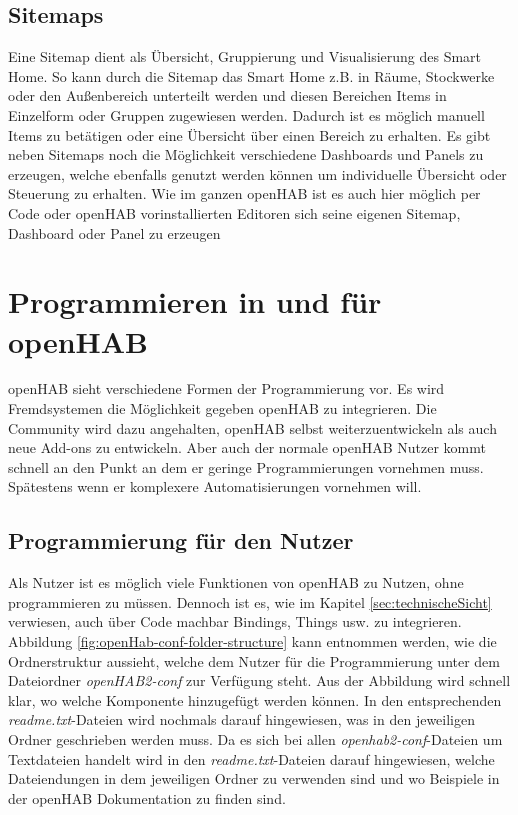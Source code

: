 \subsection{Sitemaps}
Eine Sitemap dient als Übersicht, Gruppierung und Visualisierung des Smart Home. So kann durch die Sitemap das Smart Home z.B. in Räume, Stockwerke oder den Außenbereich unterteilt werden und diesen Bereichen Items in Einzelform oder Gruppen zugewiesen werden. Dadurch ist es möglich manuell Items zu betätigen oder eine Übersicht über einen Bereich zu erhalten. Es gibt neben Sitemaps noch die Möglichkeit verschiedene Dashboards und Panels zu erzeugen, welche ebenfalls genutzt werden können um individuelle Übersicht oder Steuerung zu erhalten.
Wie im ganzen openHAB ist es auch hier möglich per Code oder openHAB vorinstallierten Editoren sich seine eigenen Sitemap, Dashboard oder Panel zu erzeugen

\section{Programmieren in und für openHAB} \label{sec:custom-development}
openHAB sieht verschiedene Formen der Programmierung vor. Es wird Fremdsystemen die Möglichkeit gegeben openHAB zu integrieren. Die Community wird dazu angehalten, openHAB selbst weiterzuentwickeln als auch neue Add-ons zu entwickeln. Aber auch der normale openHAB Nutzer kommt schnell an den Punkt an dem er geringe Programmierungen vornehmen muss. Spätestens wenn er komplexere Automatisierungen vornehmen will.

\subsection{Programmierung für den Nutzer}
Als Nutzer ist es möglich viele Funktionen von openHAB zu Nutzen, ohne programmieren zu müssen. Dennoch ist es, wie im Kapitel \ref{sec:technischeSicht} verwiesen, auch über Code machbar Bindings, Things usw. zu integrieren. Abbildung \ref{fig:openHab-conf-folder-structure} kann entnommen werden, wie die Ordnerstruktur aussieht, welche dem Nutzer für die Programmierung unter dem Dateiordner \textit{openHAB2-conf} zur Verfügung steht. Aus der Abbildung wird schnell klar, wo welche Komponente hinzugefügt werden können. In den entsprechenden \textit{readme.txt}-Dateien wird nochmals darauf hingewiesen, was in den jeweiligen Ordner geschrieben werden muss. Da es sich bei allen \textit{openhab2-conf}-Dateien um Textdateien handelt wird in den \textit{readme.txt}-Dateien darauf hingewiesen, welche Dateiendungen in dem jeweiligen Ordner zu verwenden sind und wo Beispiele in der openHAB Dokumentation zu finden sind.

